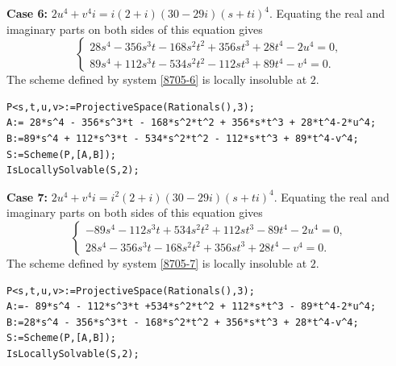 \documentclass[a4paper,12pt,english,reqno]{amsart}
\begin{document}
{\bf Case 6:} $2u^4+v^4i=i(2+i)(30-29i)(s+ti)^4$. Equating the real and imaginary parts on both sides of this equation gives
\begin{equation}\label{8705-6}
\begin{cases}
28s^4 - 356s^3t - 168s^2t^2 + 356st^3 + 28t^4 - 2u^4=0,\\
89s^4 + 112s^3t - 534s^2t^2 - 112st^3 + 89t^4 - v^4=0.
\end{cases}
\end{equation}
The scheme defined by system \eqref{8705-6} is locally insoluble at $2$.

\begin{lstlisting}
P<s,t,u,v>:=ProjectiveSpace(Rationals(),3);
A:= 28*s^4 - 356*s^3*t - 168*s^2*t^2 + 356*s*t^3 + 28*t^4-2*u^4;
B:=89*s^4 + 112*s^3*t - 534*s^2*t^2 - 112*s*t^3 + 89*t^4-v^4;
S:=Scheme(P,[A,B]);
IsLocallySolvable(S,2);
\end{lstlisting}

{\bf Case 7:} $2u^4+v^4i=i^2(2+i)(30-29i)(s+ti)^4$. Equating the real and imaginary parts on both sides of this equation gives
\begin{equation}\label{8705-7}
\begin{cases}
-89s^4 - 112s^3t + 534s^2t^2 + 112st^3 - 89t^4 - 2u^4=0,\\
28s^4 - 356s^3t - 168s^2t^2 + 356st^3 + 28t^4 - v^4=0.
\end{cases}
\end{equation}
The scheme defined by system \eqref{8705-7} is locally insoluble at $2$.

\begin{lstlisting}
P<s,t,u,v>:=ProjectiveSpace(Rationals(),3);
A:=- 89*s^4 - 112*s^3*t +534*s^2*t^2 + 112*s*t^3 - 89*t^4-2*u^4;
B:=28*s^4 - 356*s^3*t - 168*s^2*t^2 + 356*s*t^3 + 28*t^4-v^4;
S:=Scheme(P,[A,B]);
IsLocallySolvable(S,2);
\end{lstlisting}
\end{document}
